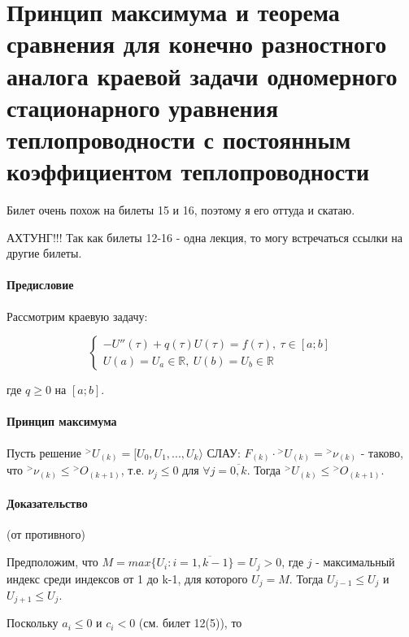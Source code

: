 \documentclass[__main__.tex]{subfiles}
\begin{document}
\section{Принцип максимума и теорема сравнения для конечно разностного аналога краевой задачи одномерного стационарного уравнения теплопроводности с постоянным коэффициентом теплопроводности}

Билет очень похож на билеты 15 и 16, поэтому я его оттуда и скатаю.

АХТУНГ!!! Так как билеты 12-16 - одна лекция, то могу встречаться ссылки на другие билеты.

\paragraph{Предисловие}

Рассмотрим краевую задачу:

\begin{equation}
\begin{cases}
-U''\left(\tau\right)+q\left(\tau\right) U \left(\tau\right) = f\left( \tau \right), \ \tau \in [a;b] \\
U\left(a\right) = U_a \in \mathbb{R}, \ U\left(b\right) = U_b \in \mathbb{R}
\end{cases}
\end{equation}

где $q \geq 0$ на $[a;b]$.

\paragraph{Принцип максимума}

Пусть решение  ${}^> U_{\left(k\right)} = [ U_0, U_1, ..., U_k \rangle$ СЛАУ: $F_{\left(k\right)} \cdot {}^> U_{\left(k\right)} = {}^> \nu_{\left(k\right)}$ - таково, что ${}^> \nu_{\left(k\right)} \leq {}^> O_{\left(k+1\right)}$, т.е. $\nu_j \leq 0$ для $\forall j = \overline{0,k}$. Тогда ${}^>U_{\left(k\right)} \leq {}^> O_{\left(k+1\right)}$.
\paragraph{Доказательство} (от противного)

Предположим, что $M = max \{U_i: i = \overline{1,k-1}\}=U_j > 0$, где $j$ - максимальный индекс среди индексов от 1 до k-1, для которого $U_j = M$. Тогда $U_{j-1} \leq U_j$ и $U_{j+1} \leq U_j$.

Поскольку $a_i \leq 0$ и $c_i < 0$ (см. билет 12(5)), то
\end{document}
